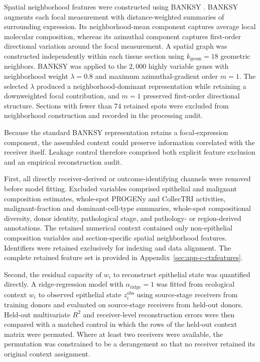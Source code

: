 Spatial neighborhood features were constructed using BANKSY
\autocite{Singhal2024-rv}. BANKSY augments each focal measurement with
distance-weighted summaries of surrounding expression. Its neighborhood-mean component captures average local molecular composition, whereas its azimuthal component captures first-order directional variation around the focal measurement. A spatial graph was constructed independently within each tissue section using \(k_{\mathrm{geom}}=18\) geometric neighbors. BANKSY was applied
to the \(2{,}000\) highly variable genes with neighborhood weight
\(\lambda=0.8\) and maximum azimuthal-gradient order \(m=1\). The selected \(\lambda\) produced a neighborhood-dominant representation while retaining a downweighted focal contribution, and \(m=1\) preserved first-order directional structure. Sections with fewer than \(74\) retained spots were excluded from neighborhood construction and recorded in the processing audit.

Because the standard BANKSY representation retains a focal-expression component, the assembled context could preserve information correlated with the receiver itself. Leakage control therefore comprised both explicit feature exclusion and an empirical reconstruction audit.

First, all directly receiver-derived or outcome-identifying channels were removed before model fitting. Excluded variables comprised epithelial and malignant composition estimates, whole-spot PROGENy and CollecTRI activities, malignant-fraction and dominant-cell-type summaries, whole-spot compositional diversity, donor identity, pathological stage, and pathology- or region-derived annotations. The retained numerical context contained only non-epithelial composition variables and section-specific spatial neighborhood features. Identifiers were retained exclusively for indexing and data alignment. The complete retained feature set is provided in Appendix~\ref{sec:app-c-ctxfeatures}.

Second, the residual capacity of \(w_i\) to reconstruct epithelial state was quantified directly. A ridge-regression model with
\(\alpha_{\mathrm{ridge}}=1\) was fitted from ecological context \(w_i\) to observed epithelial state \(z_i^{\mathrm{obs}}\) using source-stage receivers from training donors and evaluated on source-stage receivers from held-out donors. Held-out multivariate \(R^2\) and receiver-level reconstruction errors were then compared with a matched control in which the rows of the held-out context matrix were permuted. Where at least two receivers were available, the permutation was constrained to be a derangement so that no receiver retained its original context assignment.

